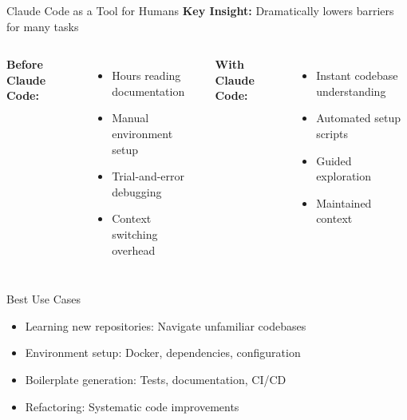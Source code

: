\documentclass[aspectratio=169]{beamer}
\begin{document}
\begin{frame}{Claude Code as a Tool for Humans}
	\textbf{Key Insight:} {\color{highlight}Dramatically lowers barriers} for many tasks
	
	\begin{columns}
		\textbf{Before Claude Code:}
		\begin{itemize}
			\item Hours reading documentation
			\item Manual environment setup
			\item Trial-and-error debugging
			\item Context switching overhead
		\end{itemize}
		
		\textbf{With Claude Code:}
		\begin{itemize}
			\item Instant codebase understanding
			\item Automated setup scripts
			\item Guided exploration
			\item Maintained context
		\end{itemize}
	\end{columns}
	
	\vspace{0.5cm}
	
	\begin{block}{Best Use Cases}
		\begin{itemize}
			\item {\color{highlight}Learning new repositories}: Navigate unfamiliar codebases
			\item {\color{highlight}Environment setup}: Docker, dependencies, configuration
			\item {\color{highlight}Boilerplate generation}: Tests, documentation, CI/CD
			\item {\color{highlight}Refactoring}: Systematic code improvements
		\end{itemize}
	\end{block}
\end{frame}
\end{document}
